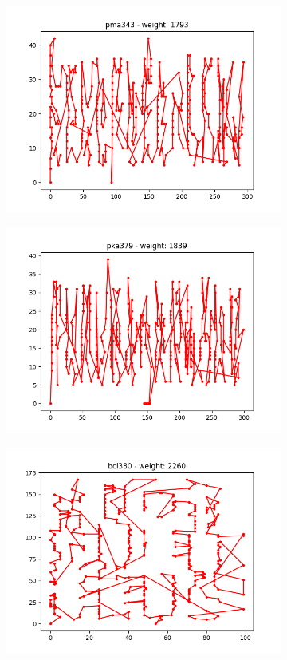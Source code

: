 \documentclass{article}
\def\v{0.4}
\begin{document}
\begin{figure}[h!]
\begin{subfigure}[b]{\v\linewidth}
		\includegraphics[width=\linewidth]{graphs/TSP_pma343.png}
	\end{subfigure}
	\begin{subfigure}[b]{\v\linewidth}
		\includegraphics[width=\linewidth]{graphs/TSP_pka379.png}
	\end{subfigure}
	\begin{subfigure}[b]{\v\linewidth}
		\includegraphics[width=\linewidth]{graphs/TSP_bcl380.png}

\end{subfigure}
\end{figure}
\end{document}
